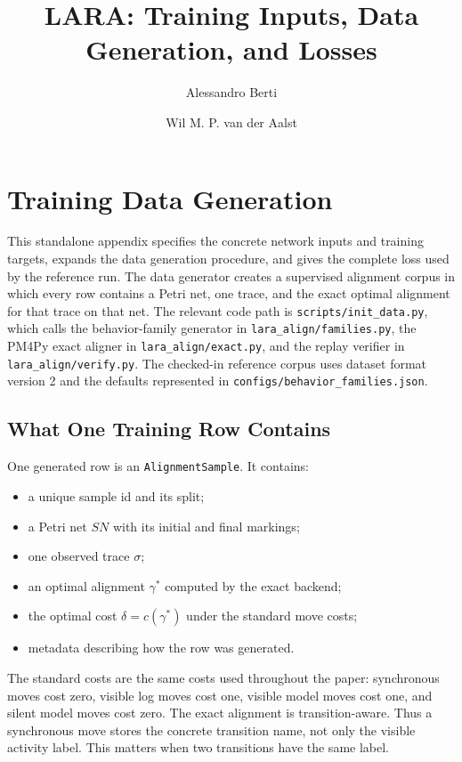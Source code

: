 \documentclass[11pt]{article}
\title{LARA: Training Inputs, Data Generation, and Losses}
\author{Alessandro Berti \and Wil M. P. van der Aalst}
\date{}
\begin{document}
\maketitle

\appendix

\section{Training Data Generation}
\label{app:data-generation}

This standalone appendix specifies the concrete network inputs and training
targets, expands the data generation procedure, and gives the complete loss
used by the reference run. The data generator creates a
supervised alignment corpus in which every row contains a Petri net, one trace,
and the exact optimal alignment for that trace on that net. The relevant code
path is \texttt{scripts/init\_data.py}, which calls the behavior-family
generator in \texttt{lara\_align/families.py}, the PM4Py exact aligner in
\texttt{lara\_align/exact.py}, and the replay verifier in
\texttt{lara\_align/verify.py}. The checked-in reference corpus uses dataset
format version 2 and the defaults represented in
\texttt{configs/behavior\_families.json}.

\subsection{What One Training Row Contains}

One generated row is an \texttt{AlignmentSample}. It contains:
\begin{itemize}
  \item a unique sample id and its split;
  \item a Petri net $SN$ with its initial and final markings;
  \item one observed trace $\sigma$;
  \item an optimal alignment $\gamma^\ast$ computed by the exact backend;
  \item the optimal cost $\delta = c(\gamma^\ast)$ under the standard move
    costs;
  \item metadata describing how the row was generated.
\end{itemize}
The standard costs are the same costs used throughout the paper: synchronous
moves cost zero, visible log moves cost one, visible model moves cost one, and
silent model moves cost zero. The exact alignment is transition-aware. Thus a
synchronous move stores the concrete transition name, not only the visible
activity label. This matters when two transitions have the same label.
\end{document}
